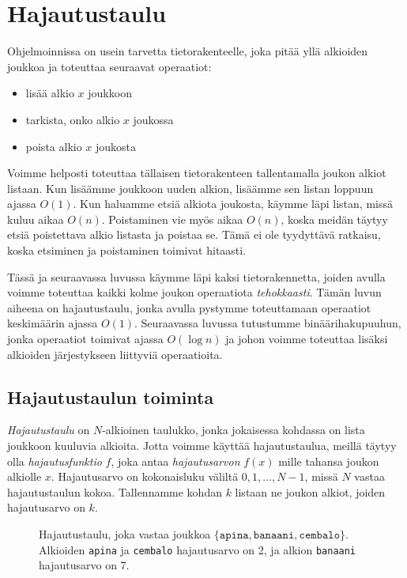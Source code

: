 \chapter{Hajautustaulu}

Ohjelmoinnissa on usein tarvetta
tietorakenteelle, joka pitää yllä alkioiden joukkoa
ja toteuttaa seuraavat operaatiot:

\begin{itemize}
\item lisää alkio $x$ joukkoon
\item tarkista, onko alkio $x$ joukossa
\item poista alkio $x$ joukosta
\end{itemize}

Voimme helposti toteuttaa tällaisen tietorakenteen
tallentamalla joukon alkiot listaan.
Kun lisäämme joukkoon uuden alkion,
lisäämme sen listan loppuun ajassa $O(1)$.
Kun haluamme etsiä alkiota joukosta,
käymme läpi listan, missä kuluu aikaa $O(n)$.
Poistaminen vie myös aikaa $O(n)$, koska meidän täytyy
etsiä poistettava alkio listasta ja poistaa se.
Tämä ei ole tyydyttävä ratkaisu,
koska etsiminen ja poistaminen toimivat hitaasti.

Tässä ja seuraavassa luvussa käymme läpi kaksi
tietorakennetta, joiden avulla voimme toteuttaa kaikki
kolme joukon operaatiota \emph{tehokkaasti}.
Tämän luvun aiheena on hajautustaulu,
jonka avulla pystymme toteuttamaan operaatiot
keskimäärin ajassa $O(1)$.
Seuraavassa luvussa tutustumme binäärihaku\-puuhun,
jonka operaatiot toimivat ajassa $O(\log n)$
ja johon voimme toteuttaa lisäksi alkioiden järjestykseen
liittyviä operaatioita.

\section{Hajautustaulun toiminta}

\emph{Hajautustaulu} on $N$-alkioinen taulukko,
jonka jokaisessa kohdassa on lista joukkoon kuuluvia alkioita.
Jotta voimme käyttää hajautustaulua,
meillä täytyy olla \emph{hajautusfunktio} $f$,
joka antaa \emph{hajautusarvon}
$f(x)$ mille tahansa joukon alkiolle $x$.
Hajautusarvo on kokonaisluku väliltä
$0,1,\dots,N-1$, missä $N$ vastaa hajautustaulun kokoa.
Tallennamme kohdan $k$ listaan ne joukon alkiot,
joiden hajautusarvo on $k$.

\begin{figure}
\caption{Hajautustaulu, joka vastaa joukkoa $\{\texttt{apina},\texttt{banaani},\texttt{cembalo}\}$.
Alkioiden \texttt{apina} ja \texttt{cembalo} hajautusarvo on 2,
ja alkion \texttt{banaani} hajautusarvo on 7.}
\label{fig:hajtau}
\end{figure}

